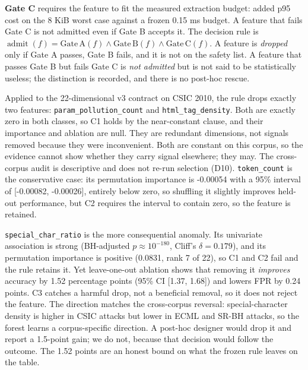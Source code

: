 \documentclass[preprint,11pt]{elsarticle}
\begin{document}
\textbf{Gate C} requires the feature to fit the measured extraction
budget: added p95 cost on the 8 KiB worst case against a frozen 0.15 ms
budget. A feature that fails Gate C is not admitted even if Gate B
accepts it. The decision rule is
\(\operatorname{admit}(f) = \mathrm{Gate\,A}(f) \land \mathrm{Gate\,B}(f) \land \mathrm{Gate\,C}(f)\).
A feature is \emph{dropped} only if Gate A passes, Gate B fails, and it
is not on the safety list. A feature that passes Gate B but fails Gate C
is \emph{not admitted} but is not said to be statistically useless; the
distinction is recorded, and there is no post-hoc rescue.

Applied to the 22-dimensional v3 contract on CSIC 2010, the rule drops
exactly two features: \texttt{param\_\allowbreak{}pollution\_\allowbreak{}count} and
\texttt{html\_\allowbreak{}tag\_\allowbreak{}density}. Both are exactly zero in both classes, so
C1 holds by the near-constant clause, and their importance and ablation
are null. They are redundant dimensions, not signals removed because
they were inconvenient. Both are constant on this corpus, so the
evidence cannot show whether they carry signal elsewhere; they may. The
cross-corpus audit is descriptive and does not re-run selection (D10).
\texttt{token\_\allowbreak{}count} is the conservative case: its permutation
importance is -0.00054 with a 95\% interval of {[}-0.00082, -0.00026{]},
entirely below zero, so shuffling it slightly improves held-out
performance, but C2 requires the interval to contain zero, so the
feature is retained.

\texttt{special\_\allowbreak{}char\_\allowbreak{}ratio} is the more consequential anomaly. Its
univariate association is strong (BH-adjusted \(p \approx 10^{-180}\),
Cliff's \(\delta = 0.179\)), and its permutation importance is positive
(0.0831, rank 7 of 22), so C1 and C2 fail and the rule retains it. Yet
leave-one-out ablation shows that removing it \emph{improves} accuracy
by 1.52 percentage points (95\% CI {[}1.37, 1.68{]}) and lowers FPR by
0.24 points. C3 catches a harmful drop, not a beneficial removal, so it
does not reject the feature. The direction matches the cross-corpus
reversal: special-character density is higher in CSIC attacks but lower
in ECML and SR-BH attacks, so the forest learns a corpus-specific
direction. A post-hoc designer would drop it and report a 1.5-point
gain; we do not, because that decision would follow the outcome. The
1.52 points are an honest bound on what the frozen rule leaves on the
table.
\end{document}

